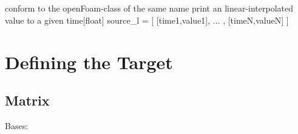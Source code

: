\documentclass[letterpaper,10pt,english]{sphinxmanual}
\begin{document}
\begin{fulllineitems}
\label{methods:diaGrabber.methods.transform.fx}~

\begin{fulllineitems}
\label{methods:diaGrabber.methods.transform.fx.get}
\end{fulllineitems}


\end{fulllineitems}


\begin{fulllineitems}
\label{methods:diaGrabber.methods.transform.interpolationTable}~

\begin{fulllineitems}
\label{methods:diaGrabber.methods.transform.interpolationTable.get}
conform to the openFoam-class of the same name
print an linear-interpolated value to a given time{[}float{]}
source\_l = {[} {[}time1,value1{]}, ... , {[}timeN,valueN{]} {]}

\end{fulllineitems}


\end{fulllineitems}



\chapter{Defining the Target}
\label{target::doc}\label{target:target}\label{target:defining-the-target}

\section{Matrix}
\label{target:matrix}

\begin{fulllineitems}
\label{target:diaGrabber.target.coarseMatrix}
Bases: 

\end{fulllineitems}
\end{document}
